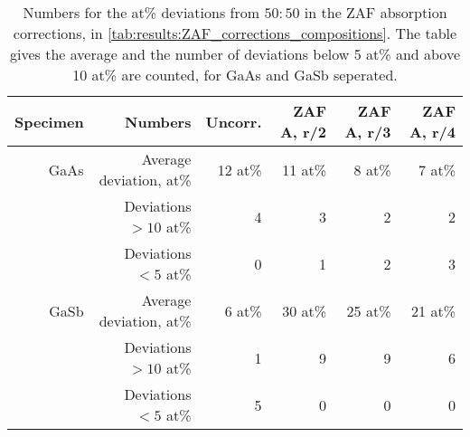 \begin{table}[phtb]
    \begin{center}
        \caption{
            Numbers for the at\% deviations from $50:50$ in the ZAF absorption corrections, in \cref{tab:results:ZAF_corrections_compositions}.
            The table gives the average and the number of deviations below 5 at\% and above 10 at\% are counted, for GaAs and GaSb seperated.
        }
        \label{tab:results:ZAF_corrections_compositions_stats}
        \begin{tabular}{rrrrrr}
            \hline
            \textbf{Specimen} & \textbf{Numbers}        & \textbf{Uncorr.} & \textbf{ZAF A, r/2} & \textbf{ZAF A, r/3} & \textbf{ZAF A, r/4} \\
            \hline

            GaAs              & Average deviation, at\% & 12 at\%          & 11 at\%             & 8 at\%              & 7 at\%              \\
                              & Deviations $>10$ at\%   & 4                & 3                   & 2                   & 2                   \\
                              & Deviations  $<5$  at\%  & 0                & 1                   & 2                   & 3                   \\
            \hline
            GaSb              & Average deviation, at\% & 6 at\%           & 30 at\%             & 25 at\%             & 21 at\%             \\
                              & Deviations $>10$ at\%   & 1                & 9                   & 9                   & 6                   \\
                              & Deviations  $<5$  at\%  & 5                & 0                   & 0                   & 0                   \\

            \hline
        \end{tabular}
    \end{center}
\end{table}
